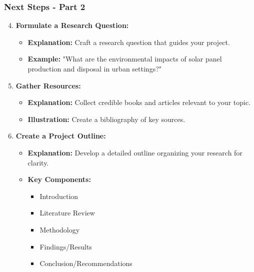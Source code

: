 \documentclass[aspectratio=169]{beamer}
\begin{document}
\begin{frame}[fragile]
    \frametitle{Next Steps - Part 2}
    \begin{enumerate}\setcounter{enumi}{3}
        \item \textbf{Formulate a Research Question:}
        \begin{itemize}
            \item \textbf{Explanation:} Craft a research question that guides your project.
            \item \textbf{Example:} "What are the environmental impacts of solar panel production and disposal in urban settings?"
        \end{itemize}

        \item \textbf{Gather Resources:}
        \begin{itemize}
            \item \textbf{Explanation:} Collect credible books and articles relevant to your topic.
            \item \textbf{Illustration:} Create a bibliography of key sources.
        \end{itemize}

        \item \textbf{Create a Project Outline:}
        \begin{itemize}
            \item \textbf{Explanation:} Develop a detailed outline organizing your research for clarity.
            \item \textbf{Key Components:}
                \begin{itemize}
                    \item Introduction
                    \item Literature Review
                    \item Methodology
                    \item Findings/Results
                    \item Conclusion/Recommendations
                \end{itemize}
        \end{itemize}
    \end{enumerate}
\end{frame}
\end{document}
